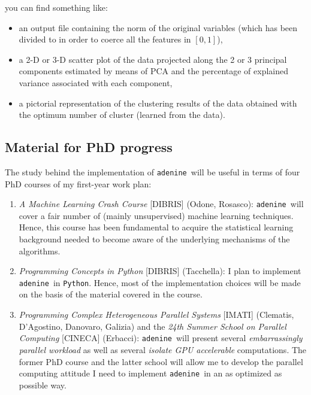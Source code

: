 \documentclass[paper=a4, fontsize=10pt]{scrartcl} %
\numberwithin{equation}{section} %
\numberwithin{figure}{section} %
\numberwithin{table}{section} %
\newcommand{\adenine}{{\tt adenine}~}
\begin{document}
you can find something like:

\begin{itemize}

	\item an output file containing the norm of the original variables (which has
	been divided to in order to coerce all the features in $[0,1]$),

	\item a 2-D or 3-D scatter plot of the data projected along the 2 or 3 principal components
	estimated by means of PCA and the percentage of explained variance associated
	with each component,

	\item a pictorial representation of the clustering results of the data
	obtained with the optimum number of cluster (learned from the data).

\end{itemize}

\subsection{Material for PhD progress}

The study behind the implementation of \adenine  will be useful in terms of
four PhD courses of my first-year work plan:

\begin{enumerate}

	\item {\sl A Machine Learning Crash Course} [DIBRIS] (Odone, Rosasco): \adenine will cover
	a fair number of (mainly unsupervised) machine learning techniques. Hence, this course
	has been fundamental to acquire the statistical learning background needed to become aware of
	the underlying mechanisms of the algorithms.

	\item {\sl Programming Concepts in Python} [DIBRIS] (Tacchella):  I plan to implement \adenine in
	{\tt Python}. Hence,  most of the implementation choices will be made on the basis of the material
	covered in the course.

  	\item {\sl Programming Complex Heterogeneous Parallel Systems} [IMATI]
	(Clematis,   D'Agostino, Danovaro, Galizia) and {the \sl 24th Summer School on
	Parallel Computing} [CINECA] (Erbacci): \adenine will present several {\sl embarrassingly
	parallel workload} as well as several {\sl isolate GPU accelerable} computations. 
	The former PhD course and the latter school will allow me to develop the parallel computing
	attitude I need to implement \adenine in an as optimized as possible way.

\end{enumerate}
\end{document}
